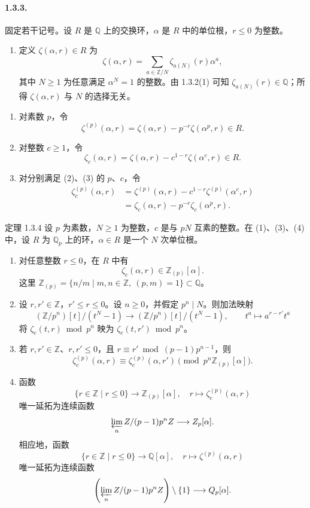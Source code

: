 \paragraph{1.3.3.}
固定若干记号。设 $R$ 是 $\mathbb Q$ 上的交换环，$\alpha$ 是 $R$ 中的单位根，$r\leq0$ 为整数。
\begin{enumerate}[label=(\arabic*)]
\item 定义 $\zeta(\alpha,r)\in R$ 为
\[
\zeta(\alpha,r)=\sum_{a\in\mathbb Z/N}\zeta_{a(N)}(r)\alpha^a,
\]
其中 $N\geq1$ 为任意满足 $\alpha^N=1$ 的整数。由 1.3.2(1) 可知 $\zeta_{a(N)}(r)\in\mathbb Q$；所得 $\zeta(\alpha,r)$ 与 $N$ 的选择无关。
\end{enumerate}
\begin{enumerate}[label=(\arabic*),start=2]
\item 对素数 $p$，令
\[
\zeta^{(p)}(\alpha,r)=\zeta(\alpha,r)-p^{-r}\zeta(\alpha^p,r)\in R.
\]
\item 对整数 $c\geq1$，令
\[
\zeta_c(\alpha,r)=\zeta(\alpha,r)-c^{1-r}\zeta(\alpha^c,r)\in R.
\]
\item 对分别满足 (2)、(3) 的 $p$、$c$，令
\begin{align*}
\zeta_c^{(p)}(\alpha,r)
&=\zeta^{(p)}(\alpha,r)-c^{1-r}\zeta^{(p)}(\alpha^c,r)\\
&=\zeta_c(\alpha,r)-p^{-r}\zeta_c(\alpha^p,r).
\end{align*}
\end{enumerate}

\begin{statement}{定理 1.3.4}
设 $p$ 为素数，$N\geq1$ 为整数，$c$ 是与 $pN$ 互素的整数。在 (1)、(3)、(4) 中，设 $R$ 为 $\mathbb Q_p$ 上的环，$\alpha\in R$ 是一个 $N$ 次单位根。
\begin{enumerate}[label=(\arabic*)]
\item 对任意整数 $r\leq0$，在 $R$ 中有
\[
\zeta_c(\alpha,r)\in\mathbb Z_{(p)}[\alpha].
\]
这里 $\mathbb Z_{(p)}=\{n/m\mid m,n\in\mathbb Z,\ (p,m)=1\}\subset\mathbb Q$。
\item 设 $r,r'\in\mathbb Z$，$r'\leq r\leq0$。设 $n\geq0$，并假定 $p^n\mid N$。则加法映射
\[
(\mathbb Z/p^n)[t]/(t^N-1)\longrightarrow(\mathbb Z/p^n)[t]/(t^N-1),
\qquad t^a\longmapsto a^{r-r'}t^a
\]
将 $\zeta_c(t,r)\bmod p^n$ 映为 $\zeta_c(t,r')\bmod p^n$。
\item 若 $r,r'\in\mathbb Z$、$r,r'\leq0$，且 $r\equiv r'\bmod(p-1)p^{n-1}$，则
\[
\zeta_c^{(p)}(\alpha,r)\equiv\zeta_c^{(p)}(\alpha,r')
\pmod{p^n\mathbb Z_{(p)}[\alpha]}.
\]
\item 函数
\[
\{r\in\mathbb Z\mid r\leq0\}\longrightarrow\mathbb Z_{(p)}[\alpha],
\quad r\longmapsto\zeta_c^{(p)}(\alpha,r)
\]
唯一延拓为连续函数
\[
\varprojlim_n\mathbb Z/(p-1)p^n\mathbb Z\longrightarrow\mathbb Z_p[\alpha].
\]
相应地，函数
\[
\{r\in\mathbb Z\mid r\leq0\}\longrightarrow\mathbb Q[\alpha],
\quad r\longmapsto\zeta^{(p)}(\alpha,r)
\]
唯一延拓为连续函数
\[
\left(\varprojlim_n\mathbb Z/(p-1)p^n\mathbb Z\right)\setminus\{1\}
\longrightarrow\mathbb Q_p[\alpha].
\]
\end{enumerate}
\end{statement}

